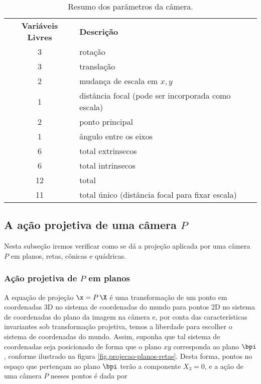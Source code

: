 \begin{table}
\begin{center}
\begin{tabular}{c l} 
\textbf{Variáveis Livres} & \textbf{Descrição}\\
3	 & rotação \\
3	 & translação \\
2	 & mudança de escala em $x,y$\\
1	 & distância focal (pode ser incorporada como escala)\\
2	 & ponto principal\\
1	 & ângulo entre os eixos \\
6  & total extrinsecos\\
6  & total intrinsecos\\
12 & total\\
11 & total único (distância focal para fixar escala)
\end{tabular}
\end{center}
\caption{Resumo dos parâmetros da câmera.}
\end{table}

\subsection{A ação projetiva de uma câmera $P$}
Nesta subseção iremos verificar como se dá a projeção aplicada por uma câmera $P$ em planos, retas, cônicas e quádricas.


\subsubsection{Ação projetiva de $P$ em planos}
A equação de projeção $\x=P\,\X$ é uma transformação de um ponto em coordenadas 3D no sistema de coordenadas do mundo para pontos 2D no sistema de coordenadas do plano da imagem na câmera e, por conta das características invariantes sob transformação projetiva, temos a liberdade para escolher o sistema de coordenadas do mundo. Assim, suponha que tal sistema de coordenadas seja posicionado de forma que o plano $xy$ corresponda ao plano $\bpi$, conforme ilustrado na figura \ref{fig.projecao-planos-retas}. Desta forma, pontos no espaço que pertençam ao plano $\bpi$ terão a componente $X_3=0$, e a ação de uma câmera $P$ nesses pontos é dada por

